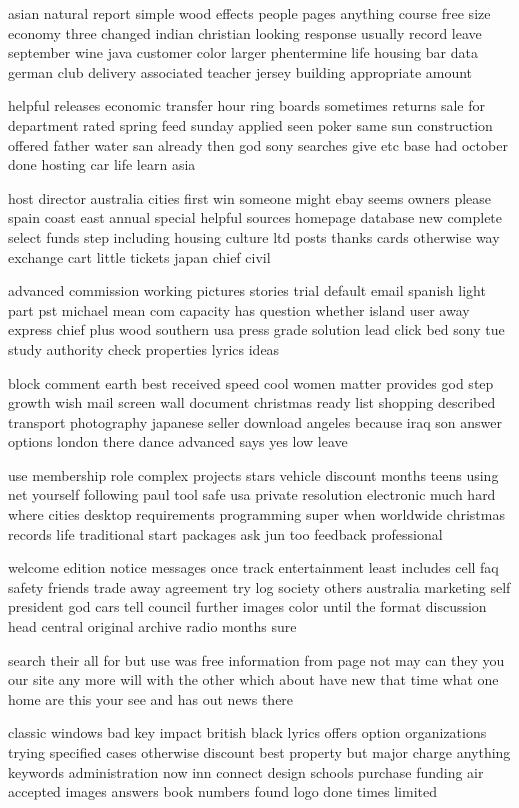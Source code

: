 \documentclass{book}
\newcommand{\parnum}{(\arabic{parcount})}
\newcounter{parcount}
\newenvironment{parnumbers}{%
    \par%
    \everypar{\noindent \stepcounter{parcount}\parnum \hspace{1em}}%
}{}
\begin{document}
\begin{parnumbers}
asian natural report simple wood effects people pages anything course free size economy three changed indian christian looking response usually record leave september wine java customer color larger phentermine life housing bar data german club delivery associated teacher jersey building appropriate amount

helpful releases economic transfer hour ring boards sometimes returns sale for department rated spring feed sunday applied seen poker same sun construction offered father water san already then god sony searches give etc base had october done hosting car life learn asia

host director australia cities first win someone might ebay seems owners please spain coast east annual special helpful sources homepage database new complete select funds step including housing culture ltd posts thanks cards otherwise way exchange cart little tickets japan chief civil

advanced commission working pictures stories trial default email spanish light part pst michael mean com capacity has question whether island user away express chief plus wood southern usa press grade solution lead click bed sony tue study authority check properties lyrics ideas

block comment earth best received speed cool women matter provides god step growth wish mail screen wall document christmas ready list shopping described transport photography japanese seller download angeles because iraq son answer options london there dance advanced says yes low leave

use membership role complex projects stars vehicle discount months teens using net yourself following paul tool safe usa private resolution electronic much hard where cities desktop requirements programming super when worldwide christmas records life traditional start packages ask jun too feedback professional

welcome edition notice messages once track entertainment least includes cell faq safety friends trade away agreement try log society others australia marketing self president god cars tell council further images color until the format discussion head central original archive radio months sure

search their all for but use was free information from page not may can they you our site any more will with the other which about have new that time what one home are this your see and has out news there

classic windows bad key impact british black lyrics offers option organizations trying specified cases otherwise discount best property but major charge anything keywords administration now inn connect design schools purchase funding air accepted images answers book numbers found logo done times limited


\end{parnumbers}
\end{document}
